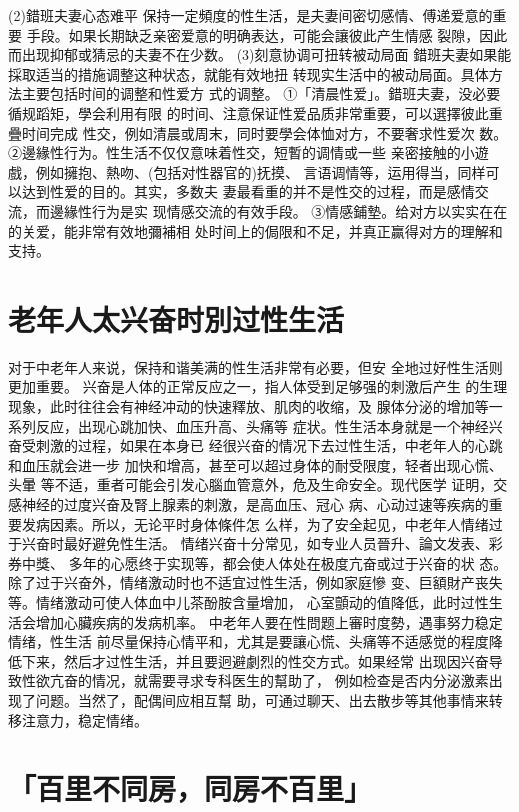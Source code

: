 \documentclass[12pt,UTF8]{ctexbook}
\begin{document}
(2)錯班夫妻心态难平
保持一定頻度的性生活，是夫妻间密切感情、傅递爱意的重要
手段。如果长期缺乏亲密爱意的明确表达，可能会讓彼此产生情感
裂隙，因此而出现抑郁或猜忌的夫妻不在少数。
(3)刻意协调可扭转被动局面
錯班夫妻如果能採取适当的措施调整这种状态，就能有效地扭
转现实生活中的被动局面。具体方法主要包括时间的调整和性爱方
式的调整。
①「清晨性爱」。錯班夫妻，没必要循规蹈矩，學会利用有限
的时间、注意保证性爱品质非常重要，可以選擇彼此重疊时间完成
性交，例如清晨或周末，同时要學会体恤对方，不要奢求性爱次
数。
②邊緣性行为。性生活不仅仅意味着性交，短暫的调情或一些
亲密接触的小遊戲，例如擁抱、熱吻、(包括对性器官的)抚摸、
言语调情等，运用得当，同样可以达到性爱的目的。其实，多数夫
妻最看重的并不是性交的过程，而是感情交流，而邊緣性行为是实
现情感交流的有效手段。
③情感鋪墊。给对方以实实在在的关爱，能非常有效地彌補相
处时间上的侷限和不足，并真正赢得对方的理解和支持。


\section{老年人太兴奋时別过性生活}

对于中老年人来说，保持和谐美满的性生活非常有必要，但安
全地过好性生活则更加重要。
兴奋是人体的正常反应之一，指人体受到足够强的刺激后产生
的生理现象，此时往往会有神经冲动的快速釋放、肌肉的收缩，及
腺体分泌的增加等一系列反应，出现心跳加快、血压升高、头痛等
症状。性生活本身就是一个神经兴奋受刺激的过程，如果在本身已
经很兴奋的情况下去过性生活，中老年人的心跳和血压就会进一步
加快和增高，甚至可以超过身体的耐受限度，轻者出现心慌、头暈
等不适，重者可能会引发心腦血管意外，危及生命安全。现代医学
证明，交感神经的过度兴奋及腎上腺素的刺激，是高血压、冠心
病、心动过速等疾病的重要发病因素。所以，无论平时身体條件怎
么样，为了安全起见，中老年人情绪过于兴奋时最好避免性生活。
情绪兴奋十分常见，如专业人员晉升、論文发表、彩券中獎、
多年的心愿终于实现等，都会使人体处在极度亢奋或过于兴奋的状
态。除了过于兴奋外，情绪激动时也不适宜过性生活，例如家庭慘
变、巨額財产丧失等。情绪激动可使人体血中儿茶酚胺含量增加，
心室顫动的值降低，此时过性生活会增加心臟疾病的发病机率。
中老年人要在性問题上審时度勢，遇事努力稳定情绪，性生活
前尽量保持心情平和，尤其是要讓心慌、头痛等不适感觉的程度降
低下来，然后才过性生活，并且要迥避劇烈的性交方式。如果经常
出现因兴奋导致性欲亢奋的情况，就需要寻求专科医生的幫助了，
例如检查是否内分泌激素出现了问题。当然了，配偶间应相互幫
助，可通过聊天、出去散步等其他事情来转移注意力，稳定情绪。

\section{「百里不同房，同房不百里」}
\end{document}
